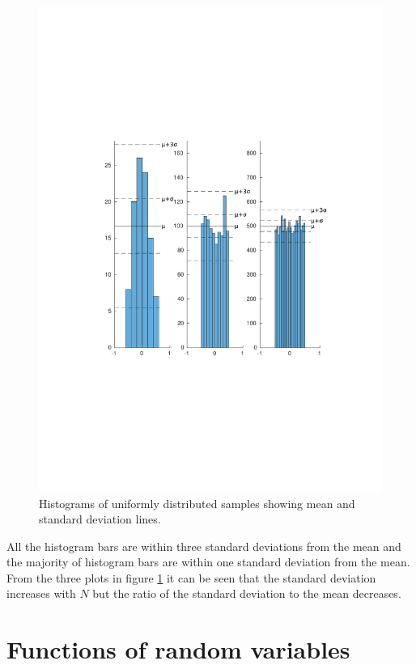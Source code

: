 \documentclass[12pt]{article}
\begin{document}
\begin{figure}[H]
\includegraphics[width=\textwidth]{figures/uniform-bar-distribution.pdf}
  \caption{Histograms of uniformly distributed samples showing mean and standard deviation lines.}
  \label{fig:hist-dist}
\end{figure}


All the histogram bars are within three standard deviations from the mean and the majority of histogram bars are within one standard deviation from the mean. From the three plots in figure \ref{fig:hist-dist} it can be seen that the standard deviation increases with $N$ but the ratio of the standard deviation to the mean decreases.


\section{Functions of random variables}
\end{document}
